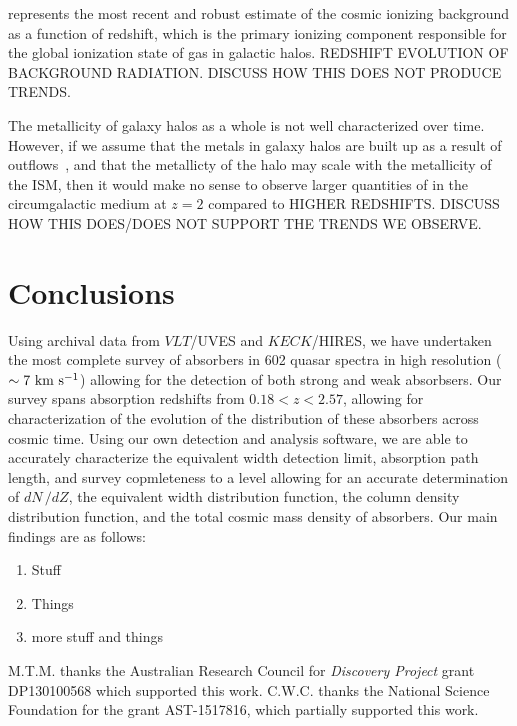 \documentclass[linenumbers,twocolumn]{aastex61}
\begin{document}
\cite{Haardt2012} represents the most recent and robust estimate of the cosmic ionizing background as a function of redshift, which is the primary ionizing component responsible for the global ionization state of gas in galactic halos. REDSHIFT EVOLUTION OF BACKGROUND RADIATION. DISCUSS HOW THIS DOES NOT PRODUCE TRENDS.

The metallicity of galaxy halos as a whole is not well characterized over time. However, if we assume that the metals in galaxy halos are built up as a result of outflows~\citep{Quiret2016}, and that the metallicty of the halo may scale with the metallicity of the ISM, then it would make no sense to observe larger quantities of {\CIV} in the circumgalactic medium at $z = 2$ compared to HIGHER REDSHIFTS. DISCUSS HOW THIS DOES/DOES NOT SUPPORT THE TRENDS WE OBSERVE.

\section{Conclusions}
\label{sec:conclusions}

Using archival data from $VLT$/UVES and $KECK$/HIRES, we have undertaken the most complete survey of {\CIV} absorbers in 602 quasar spectra in high resolution ($\sim 7~\mathrm{\hbox{km~s$^{-1}$}}$) allowing for the detection of both strong and weak {\CIV} absorbsers. Our survey spans absorption redshifts from $0.18 < z < 2.57$, allowing for characterization of the evolution of the distribution of these absorbers across cosmic time. Using our own detection and analysis software, we are able to accurately characterize the equivalent width detection limit, absorption path length, and survey copmleteness to a level allowing for an accurate determination of $dN\,/dZ$, the equivalent width distribution function, the column density distribution function, and the total cosmic mass density of {\CIV} absorbers. Our main findings are as follows:

\begin{enumerate}
\item Stuff
\item Things
\item more stuff and things
\end{enumerate}

M.T.M. thanks the Australian Research Council for \textsl{Discovery Project} grant DP130100568 which supported this work. C.W.C. thanks the National Science Foundation for the grant AST-1517816, which partially supported this work.



\end{document}
